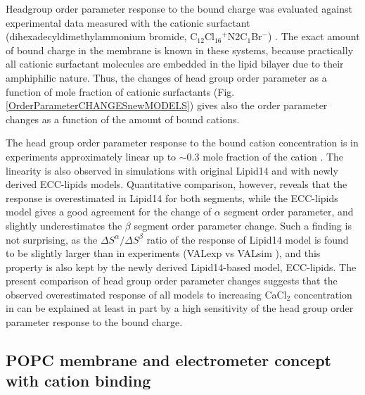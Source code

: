 \documentclass[aip,jcp,twocolumn]{revtex4}
\begin{document}
Headgroup order parameter response to the bound charge was evaluated against
experimental data measured with the cationic surfactant
(dihexadecyldimethylammonium bromide, C$_{12}$Cl$_{16}$$^+$N2C$_1$Br$^-$) \cite{scherer89}.
The exact amount of bound charge in the membrane is known in these systems, because
practically all cationic surfactant molecules are embedded in the lipid bilayer due to
their amphiphilic nature. Thus, the changes of head group order parameter as a function of
mole fraction of cationic surfactants (Fig. \ref{OrderParameterCHANGESnewMODELS}) gives
also the order parameter changes as a function of the amount of bound cations.

The head group order parameter response to the bound cation concentration
is in experiments approximately linear up to $\sim$0.3 mole fraction of the cation \cite{scherer89}.
The linearity is also observed in simulations with original Lipid14 and with newly derived ECC-lipids models.
Quantitative comparison, however, reveals that the response is overestimated in 
Lipid14 for both segments, while the ECC-lipids model gives a
good agreement for the change of $\alpha$ segment order parameter, and slightly
underestimates the $\beta$ segment order parameter change.
Such a finding is not surprising, as the $\Delta S^\alpha/\Delta S^\beta$ ratio 
of the response of Lipid14 model is found to be slightly larger than in 
experiments (VALexp vs VALsim
), and this property is also kept by the newly derived Lipid14-based model, ECC-lipids. 
The present comparison of head group order parameter changes 
suggests that the observed overestimated response of all models to 
increasing CaCl$_2$ concentration in \cite{catte16} 
can be explained at least in part by a high sensitivity of the head group order parameter response
to the bound charge.






\subsection{POPC membrane and electrometer concept with cation binding}
\end{document}
